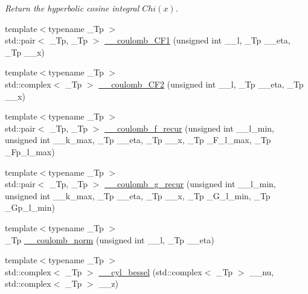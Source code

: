 \begin{DoxyCompactItemize}
\begin{DoxyCompactList}\small\item\em Return the hyperbolic cosine integral $ Chi(x) $. \end{DoxyCompactList}\item 
{\footnotesize template$<$typename \+\_\+\+Tp $>$ }\\std\+::pair$<$ \+\_\+\+Tp, \+\_\+\+Tp $>$ \hyperlink{namespacestd_1_1____detail_a0737f268d024ed5d66d3e926239a5c49}{\+\_\+\+\_\+coulomb\+\_\+\+C\+F1} (unsigned int \+\_\+\+\_\+l, \+\_\+\+Tp \+\_\+\+\_\+eta, \+\_\+\+Tp \+\_\+\+\_\+x)
\item 
{\footnotesize template$<$typename \+\_\+\+Tp $>$ }\\std\+::complex$<$ \+\_\+\+Tp $>$ \hyperlink{namespacestd_1_1____detail_a400332397b6d529764b61bdd7726f75c}{\+\_\+\+\_\+coulomb\+\_\+\+C\+F2} (unsigned int \+\_\+\+\_\+l, \+\_\+\+Tp \+\_\+\+\_\+eta, \+\_\+\+Tp \+\_\+\+\_\+x)
\item 
{\footnotesize template$<$typename \+\_\+\+Tp $>$ }\\std\+::pair$<$ \+\_\+\+Tp, \+\_\+\+Tp $>$ \hyperlink{namespacestd_1_1____detail_ab6a730206fba9db024f3c1c26fe6a954}{\+\_\+\+\_\+coulomb\+\_\+f\+\_\+recur} (unsigned int \+\_\+\+\_\+l\+\_\+min, unsigned int \+\_\+\+\_\+k\+\_\+max, \+\_\+\+Tp \+\_\+\+\_\+eta, \+\_\+\+Tp \+\_\+\+\_\+x, \+\_\+\+Tp \+\_\+\+F\+\_\+l\+\_\+max, \+\_\+\+Tp \+\_\+\+Fp\+\_\+l\+\_\+max)
\item 
{\footnotesize template$<$typename \+\_\+\+Tp $>$ }\\std\+::pair$<$ \+\_\+\+Tp, \+\_\+\+Tp $>$ \hyperlink{namespacestd_1_1____detail_ad3bcd9e0587db5699088065900382e8b}{\+\_\+\+\_\+coulomb\+\_\+g\+\_\+recur} (unsigned int \+\_\+\+\_\+l\+\_\+min, unsigned int \+\_\+\+\_\+k\+\_\+max, \+\_\+\+Tp \+\_\+\+\_\+eta, \+\_\+\+Tp \+\_\+\+\_\+x, \+\_\+\+Tp \+\_\+\+G\+\_\+l\+\_\+min, \+\_\+\+Tp \+\_\+\+Gp\+\_\+l\+\_\+min)
\item 
{\footnotesize template$<$typename \+\_\+\+Tp $>$ }\\\+\_\+\+Tp \hyperlink{namespacestd_1_1____detail_a568c1e2b831de815e9ffb1b9c9fe1170}{\+\_\+\+\_\+coulomb\+\_\+norm} (unsigned int \+\_\+\+\_\+l, \+\_\+\+Tp \+\_\+\+\_\+eta)
\item 
{\footnotesize template$<$typename \+\_\+\+Tp $>$ }\\std\+::complex$<$ \+\_\+\+Tp $>$ \hyperlink{namespacestd_1_1____detail_ac4cff6a34fbd90932b47ecdb2445dee2}{\+\_\+\+\_\+cyl\+\_\+bessel} (std\+::complex$<$ \+\_\+\+Tp $>$ \+\_\+\+\_\+nu, std\+::complex$<$ \+\_\+\+Tp $>$ \+\_\+\+\_\+z)

\end{DoxyCompactItemize}
